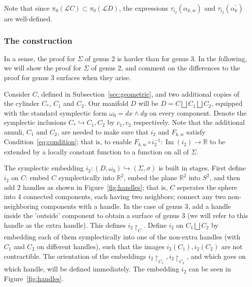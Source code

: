 \documentclass[11pt]{article}
\newcommand{\R}{\mathbb{R}}
\DeclareMathOperator{\Ima}{Im}
\begin{document}
        Note that since $\pi_0(\mathscr{L}C) \subset \pi_0(\mathscr{L}D)$, the expressions $\tau_{i_2}(\alpha_{k,w})$ and $\tau_{i_2}(\alpha_k^\prime)$ are well-defined.
        
        \subsubsection{The construction}
        \label{sec:3.2.1}
            In a sense, the proof for $\Sigma$ of genus 2 is harder than for genus 3. In the following, we will show the proof for $\Sigma$ of genus 2, and comment on the differences to the proof for genus 3 surfaces when they arise.
            
            Consider $C$, defined in Subsection~\ref{sec:geometric}, and two additional copies of the cylinder $C_*$, $C_1$ and $C_2$. Our manifold $D$ will be $D = C \bigsqcup C_1 \bigsqcup C_2$, equipped with the standard symplectic form $\omega_0 = dx \wedge dy$ on every component. Denote the symplectic inclusions $C_* \hookrightarrow C_1,C_2$ by $c_1,c_2$ respectively. Note that the additional annuli, $C_1$ and $C_2$, are needed to make sure that $i_2$ and $F_{k,w}$ satisfy Condition~\ref{eq:condition}; that is, to enable $F_{k,w} \circ i_2^{-1}: \Ima(i_2) \to \R$ to be extended by a locally constant function to a function on all of $\Sigma$.
            
            The symplectic embedding $i_2:(D,\omega_0) \hookrightarrow (\Sigma, \sigma)$ is built in stages. First define $i_2$ on $C$: embed $C$ symplectically into $\R^2$, embed the plane $\R^2$ into $S^2$, and then add 2 handles as shown in Figure~\ref{fig:handles}; that is, $C$ seperates the sphere into 4 connected components, each having two neighbors; connect any two non-neighboring components with a handle. In the case of genus 3, add a handle inside the 'outside' component to obtain a surface of genus 3 (we will refer to this handle as the extra handle). This defines $i_2 \restriction_C$. Define $i_2$ on $C_1 \bigsqcup C_2$ by embedding each of them symplectically into one of the non-extra handles (with $C_1$ and $C_2$ on different handles), such that the images $i_2(C_1), i_2(C_2)$ are not contractible. The orientation of the embeddings $i_2\restriction_{C_1}, i_2\restriction_{C_2}$, and which goes on which handle, will be defined immediately. The embedding $i_2$ can be seen in Figure~\ref{fig:handles}.
            
\end{document}
